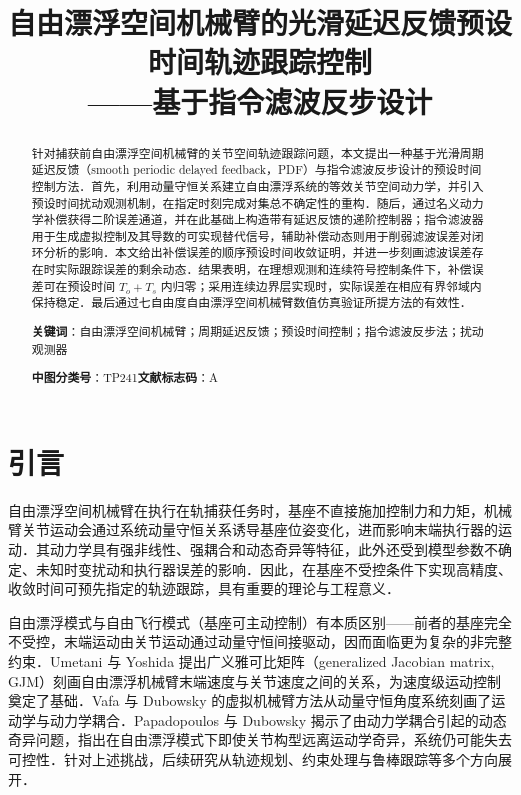 \documentclass[12pt,a4paper]{article}
\title{自由漂浮空间机械臂的光滑延迟反馈预设时间轨迹跟踪控制\\[3pt]
——基于指令滤波反步设计}
\author{}
\date{}
\theoremstyle{definition}
\theoremstyle{remark}
\begin{document}
\maketitle
\thispagestyle{fancy}

\begin{abstract}
\small
针对捕获前自由漂浮空间机械臂的关节空间轨迹跟踪问题，本文提出一种基于光滑周期延迟反馈（smooth periodic delayed feedback，PDF）与指令滤波反步设计的预设时间控制方法．首先，利用动量守恒关系建立自由漂浮系统的等效关节空间动力学，并引入预设时间扰动观测机制，在指定时刻完成对集总不确定性的重构．随后，通过名义动力学补偿获得二阶误差通道，并在此基础上构造带有延迟反馈的递阶控制器；指令滤波器用于生成虚拟控制及其导数的可实现替代信号，辅助补偿动态则用于削弱滤波误差对闭环分析的影响．本文给出补偿误差的顺序预设时间收敛证明，并进一步刻画滤波误差存在时实际跟踪误差的剩余动态．结果表明，在理想观测和连续符号控制条件下，补偿误差可在预设时间 $T_o+T_s$ 内归零；采用连续边界层实现时，实际误差在相应有界邻域内保持稳定．最后通过七自由度自由漂浮空间机械臂数值仿真验证所提方法的有效性．

\vspace{0.5em}
\noindent\textbf{关键词}：自由漂浮空间机械臂；周期延迟反馈；预设时间控制；指令滤波反步法；扰动观测器

\vspace{0.3em}
\noindent\textbf{中图分类号}：TP241\qquad \textbf{文献标志码}：A
\end{abstract}

\section{引言}

自由漂浮空间机械臂在执行在轨捕获任务时，基座不直接施加控制力和力矩，机械臂关节运动会通过系统动量守恒关系诱导基座位姿变化，进而影响末端执行器的运动．其动力学具有强非线性、强耦合和动态奇异等特征，此外还受到模型参数不确定、未知时变扰动和执行器误差的影响\cite{yanyuxin2025}．因此，在基座不受控条件下实现高精度、收敛时间可预先指定的轨迹跟踪，具有重要的理论与工程意义．


自由漂浮模式与自由飞行模式（基座可主动控制）有本质区别——前者的基座完全不受控，末端运动由关节运动通过动量守恒间接驱动，因而面临更为复杂的非完整约束．Umetani 与 Yoshida\cite{umetani1989} 提出广义雅可比矩阵（generalized Jacobian matrix, GJM）刻画自由漂浮机械臂末端速度与关节速度之间的关系，为速度级运动控制奠定了基础．Vafa 与 Dubowsky\cite{vafa1990} 的虚拟机械臂方法从动量守恒角度系统刻画了运动学与动力学耦合．Papadopoulos 与 Dubowsky\cite{papadopoulos1993} 揭示了由动力学耦合引起的动态奇异问题，指出在自由漂浮模式下即使关节构型远离运动学奇异，系统仍可能失去可控性．针对上述挑战，后续研究从轨迹规划、约束处理与鲁棒跟踪等多个方向展开．
\end{document}
